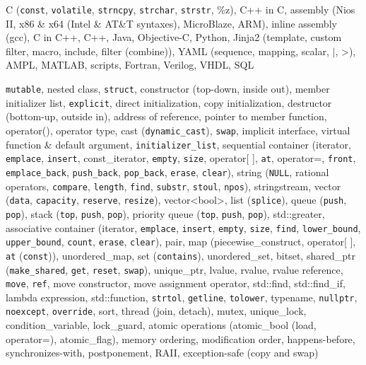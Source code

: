 \documentclass[letterpaper,11pt]{article}
\begin{document}
\begin{description}
\setlength{\itemindent}{-0.1in}

\item[Programming Languages:] C ({\tt const}, {\tt volatile}, {\tt strncpy}, {\tt strchar}, {\tt strstr}, \%z), C++ in C,
assembly (Nios II, x86 \& x64 (Intel \& AT\&T syntaxes), MicroBlaze, ARM),
inline assembly (gcc), C in C++,
%
C++,
%
Java, Objective-C,
%
Python,
%
Jinja2 (template, custom filter, macro, include, filter (combine)), YAML (sequence, mapping, scalar, $|$, \textgreater),
AMPL, MATLAB,
%
scripts,
%
Fortran, Verilog, VHDL, SQL %

\item[C++:] {\tt mutable}, nested class,
{\tt struct}, constructor (top-down, inside out), member initializer list, {\tt explicit}, direct initialization, copy initialization,
destructor (bottom-up, outside in), address of reference, pointer to member function, operator(), operator type,
cast ({\tt dynamic\_cast}), {\tt swap},
implicit interface, virtual function \& default argument, {\tt initializer\_list},
%
sequential container (iterator, {\tt emplace}, {\tt insert}, const\_iterator,
{\tt empty}, {\tt size}, operator[ ], {\tt at}, operator=, {\tt front}, {\tt emplace\_back},
{\tt push\_back}, {\tt pop\_back}, {\tt erase}, {\tt clear}),
%
string ({\tt NULL}, rational operators, {\tt compare}, {\tt length}, {\tt find}, {\tt substr}, {\tt stoul}, {\tt npos}), stringstream,
%
vector ({\tt data}, {\tt capacity}, {\tt reserve}, {\tt resize}), vector\textless bool\textgreater,
list ({\tt splice}),
queue ({\tt push}, {\tt pop}), stack ({\tt top}, {\tt push}, {\tt pop}),
priority queue ({\tt top}, {\tt push}, {\tt pop}), std::greater,
%
associative container (iterator, {\tt emplace}, {\tt insert}, {\tt empty}, {\tt size},
{\tt find}, {\tt lower\_bound}, {\tt upper\_bound},
{\tt count}, {\tt erase}, {\tt clear}),
%
pair, map (piecewise\_construct, operator[ ], {\tt at} ({\tt const})), unordered\_map, set ({\tt contains}), unordered\_set,
%
bitset,
%
shared\_ptr ({\tt make\_shared}, {\tt get}, {\tt reset}, {\tt swap}), unique\_ptr,
lvalue, rvalue, rvalue reference, {\tt move}, {\tt ref}, move constructor, move assignment operator,
%
std::find, std::find\_if, lambda expression, std::function, {\tt strtol}, {\tt getline}, {\tt tolower},
typename, {\tt nullptr}, {\tt noexcept}, {\tt override},
sort,
%
thread (join, detach),
mutex, unique\_lock, condition\_variable, lock\_guard,
atomic operations (atomic\_bool (load, operator=), atomic\_flag), memory ordering, modification order, happens-before, synchronizes-with,
%
postponement, RAII, exception-safe (copy and swap)


\end{description}
\end{document}
